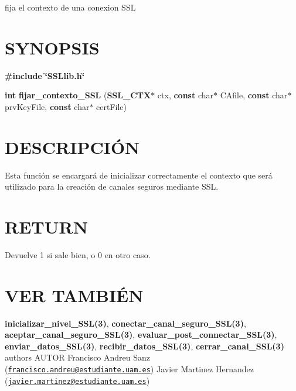 fija el contexto de una conexion S\-S\-L\hypertarget{unknown_case_SYNOPSIS}{}\section{S\-Y\-N\-O\-P\-S\-I\-S}\label{unknown_case_SYNOPSIS}
{\bfseries \#include} {\bfseries \char`\"{}\-S\-S\-Llib.\-h\char`\"{}} 

{\bfseries int} {\bfseries fijar\-\_\-contexto\-\_\-\-S\-S\-L} {\bfseries }({\bfseries S\-S\-L\-\_\-\-C\-T\-X$\ast$} ctx, {\bfseries const} char$\ast$ C\-Afile, {\bfseries const} char$\ast$ prv\-Key\-File, {\bfseries const} char$\ast$ cert\-File{\bfseries })\hypertarget{unknown_case_descripcion}{}\section{D\-E\-S\-C\-R\-I\-P\-C\-IÓ\-N}\label{unknown_case_descripcion}
Esta función se encargará de inicializar correctamente el contexto que será utilizado para la creación de canales seguros mediante S\-S\-L.\hypertarget{cerrar_canal_SSL_return}{}\section{R\-E\-T\-U\-R\-N}\label{cerrar_canal_SSL_return}
Devuelve 1 si sale bien, o 0 en otro caso.\hypertarget{unknown_case_seealso}{}\section{V\-E\-R T\-A\-M\-B\-IÉ\-N}\label{unknown_case_seealso}
{\bfseries inicializar\-\_\-nivel\-\_\-\-S\-S\-L(3)}, {\bfseries conectar\-\_\-canal\-\_\-seguro\-\_\-\-S\-S\-L(3)}, {\bfseries aceptar\-\_\-canal\-\_\-seguro\-\_\-\-S\-S\-L(3)}, {\bfseries evaluar\-\_\-post\-\_\-connectar\-\_\-\-S\-S\-L(3)}, {\bfseries enviar\-\_\-datos\-\_\-\-S\-S\-L(3)}, {\bfseries recibir\-\_\-datos\-\_\-\-S\-S\-L(3)}, {\bfseries cerrar\-\_\-canal\-\_\-\-S\-S\-L(3)} {\bfseries }  authors A\-U\-T\-O\-R Francisco Andreu Sanz (\href{mailto:francisco.andreu@estudiante.uam.es}{\tt francisco.\-andreu@estudiante.\-uam.\-es}) Javier Martinez Hernandez (\href{mailto:javier.martinez@estudiante.uam.es}{\tt javier.\-martinez@estudiante.\-uam.\-es}) 